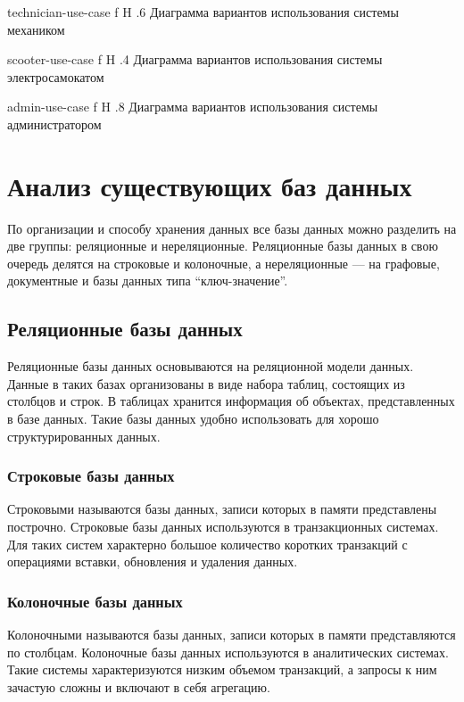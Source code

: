 {technician-use-case}
{f}
{H}
{.6\textwidth}
{Диаграмма вариантов использования системы механиком}

{scooter-use-case}
{f}
{H}
{.4\textwidth}
{Диаграмма вариантов использования системы электросамокатом}

{admin-use-case}
{f}
{H}
{.8\textwidth}
{Диаграмма вариантов использования системы администратором}

\section{Анализ существующих баз данных}

По организации и способу хранения данных все базы данных можно разделить на две группы: реляционные и нереляционные. Реляционные базы данных в свою очередь делятся на строковые и колоночные, а нереляционные --- на графовые, документные и базы данных типа \enquote{ключ-значение}.

\subsection{Реляционные базы данных}

Реляционные базы данных основываются на реляционной модели данных. Данные в таких базах организованы в виде набора таблиц, состоящих из столбцов и строк. В таблицах хранится информация об объектах, представленных в базе данных. Такие базы данных удобно использовать для хорошо структурированных данных.

\subsubsection{Строковые базы данных}

Строковыми называются базы данных, записи которых в памяти представлены построчно. Строковые базы данных используются в транзакционных системах. Для таких систем характерно большое количество коротких транзакций с операциями вставки, обновления и удаления данных.

\subsubsection{Колоночные базы данных}

Колоночными называются базы данных, записи которых в памяти представляются по столбцам. Колоночные базы данных используются в аналитических системах. Такие системы характеризуются низким объемом транзакций, а запросы к ним зачастую сложны и включают в себя агрегацию.

